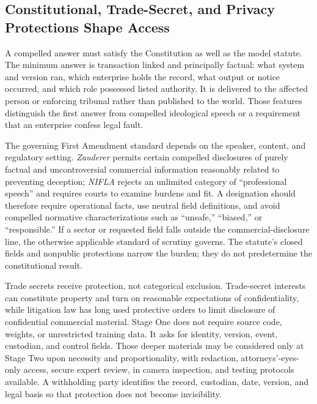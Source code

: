 \subsection{Constitutional, Trade-Secret, and Privacy Protections Shape Access}

A compelled answer must satisfy the Constitution as well as the model statute. The minimum answer is transaction linked and principally factual: what system and version ran, which enterprise holds the record, what output or notice occurred, and which role possessed listed authority. It is delivered to the affected person or enforcing tribunal rather than published to the world. Those features distinguish the first answer from compelled ideological speech or a requirement that an enterprise confess legal fault.

The governing First Amendment standard depends on the speaker, content, and regulatory setting. \emph{Zauderer} permits certain compelled disclosures of purely factual and uncontroversial commercial information reasonably related to preventing deception; \emph{NIFLA} rejects an unlimited category of ``professional speech'' and requires courts to examine burdens and fit. A designation should therefore require operational facts, use neutral field definitions, and avoid compelled normative characterizations such as ``unsafe,'' ``biased,'' or ``responsible.'' If a sector or requested field falls outside the commercial-disclosure line, the otherwise applicable standard of scrutiny governs. The statute's closed fields and nonpublic protections narrow the burden; they do not predetermine the constitutional result.

Trade secrets receive protection, not categorical exclusion. Trade-secret interests can constitute property and turn on reasonable expectations of confidentiality, while litigation law has long used protective orders to limit disclosure of confidential commercial material. Stage One does not require source code, weights, or unrestricted training data. It asks for identity, version, event, custodian, and control fields. Those deeper materials may be considered only at Stage Two upon necessity and proportionality, with redaction, attorneys'-eyes-only access, secure expert review, in camera inspection, and testing protocols available. A withholding party identifies the record, custodian, date, version, and legal basis so that protection does not become invisibility.

